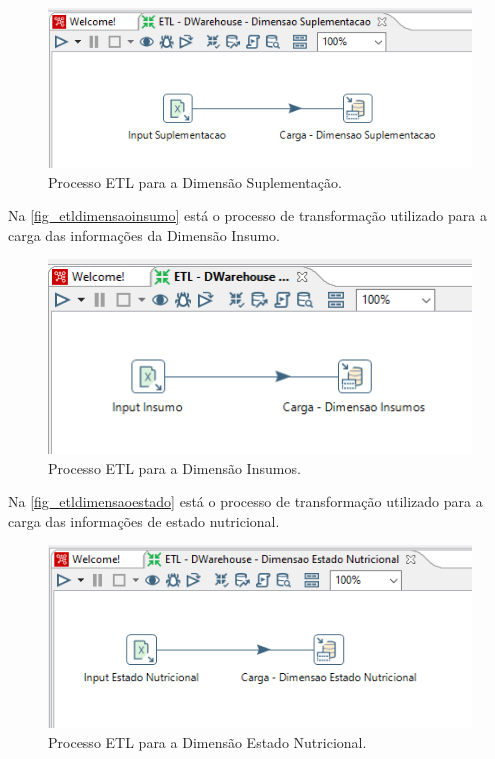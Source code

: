 \begin{figure}[htb]
	\caption{\label{fig_etldimensaosuplementacao}Processo ETL para a Dimensão Suplementação.}
	\begin{center}
	    \includegraphics[scale=1]{Imagens/figura - etl dw suplementacao.png}
	\end{center}
\end{figure}

Na \autoref{fig_etldimensaoinsumo} está o processo de transformação utilizado para a carga das informações da Dimensão Insumo.

\begin{figure}[htb]
	\caption{\label{fig_etldimensaoinsumo}Processo ETL para a Dimensão Insumos.}
	\begin{center}
	    \includegraphics[scale=0.7]{Imagens/figura - etl dw insumos.png}
	\end{center}
\end{figure}

\newpage
Na \autoref{fig_etldimensaoestado} está o processo de transformação utilizado para a carga das informações de estado nutricional.

\begin{figure}[htb]
	\caption{\label{fig_etldimensaoestado}Processo ETL para a Dimensão Estado Nutricional.}
	\begin{center}
	    \includegraphics[scale=0.7]{Imagens/figura - etl dw estadonutricional.png}
	\end{center}
\end{figure}

